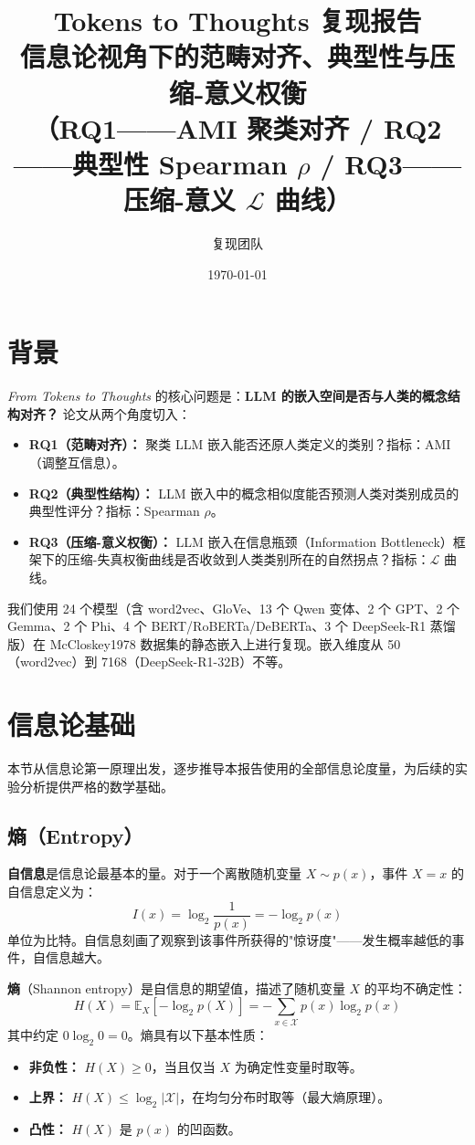 \documentclass[11pt,a4paper]{article}
\title{\vspace{-2cm}\textbf{Tokens to Thoughts 复现报告}\\\large 信息论视角下的范畴对齐、典型性与压缩-意义权衡\\
（RQ1——AMI 聚类对齐 / RQ2——典型性 Spearman $\rho$ / RQ3——压缩-意义 $\mathcal{L}$ 曲线）}
\author{复现团队}
\date{\today}
\newcommand{\E}{\mathbb{E}}
\begin{document}
\maketitle

\section{背景}

\textit{From Tokens to Thoughts} \cite{shani2025} 的核心问题是：\textbf{LLM 的嵌入空间是否与人类的概念结构对齐？} 论文从两个角度切入：

\begin{itemize}[noitemsep]
  \item \textbf{RQ1（范畴对齐）：} 聚类 LLM 嵌入能否还原人类定义的类别？指标：AMI（调整互信息）。
  \item \textbf{RQ2（典型性结构）：} LLM 嵌入中的概念相似度能否预测人类对类别成员的典型性评分？指标：Spearman $\rho$。
  \item \textbf{RQ3（压缩-意义权衡）：} LLM 嵌入在信息瓶颈（Information Bottleneck）框架下的压缩-失真权衡曲线是否收敛到人类类别所在的自然拐点？指标：$\mathcal{L}$ 曲线。
\end{itemize}

我们使用 24 个模型（含 word2vec、GloVe、13 个 Qwen 变体、2 个 GPT、2 个 Gemma、2 个 Phi、4 个 BERT/RoBERTa/DeBERTa、3 个 DeepSeek-R1 蒸馏版）在 McCloskey1978 数据集的静态嵌入上进行复现。嵌入维度从 50（word2vec）到 7168（DeepSeek-R1-32B）不等。

\section{信息论基础}

本节从信息论第一原理出发，逐步推导本报告使用的全部信息论度量，为后续的实验分析提供严格的数学基础。

\subsection{熵（Entropy）}

\textbf{自信息}是信息论最基本的量。对于一个离散随机变量 $X \sim p(x)$，事件 $X=x$ 的自信息定义为：
\[
I(x) = \log_2 \frac{1}{p(x)} = -\log_2 p(x)
\]
单位为比特。自信息刻画了观察到该事件所获得的"惊讶度"——发生概率越低的事件，自信息越大。

\textbf{熵}（Shannon entropy）是自信息的期望值，描述了随机变量 $X$ 的平均不确定性：
\[
H(X) = \E_{X}\left[-\log_2 p(X)\right] = -\sum_{x \in \mathcal{X}} p(x) \log_2 p(x)
\tag{1}
\]
其中约定 $0\log_2 0 = 0$。熵具有以下基本性质：
\begin{itemize}[noitemsep]
  \item \textbf{非负性：} $H(X) \geq 0$，当且仅当 $X$ 为确定性变量时取等。
  \item \textbf{上界：} $H(X) \leq \log_2 |\mathcal{X}|$，在均匀分布时取等（最大熵原理）。
  \item \textbf{凸性：} $H(X)$ 是 $p(x)$ 的凹函数。
\end{itemize}
\end{document}
